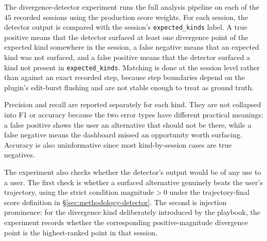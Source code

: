 The divergence-detector experiment runs the full analysis pipeline on each of the $45$ recorded sessions using the production score weights. For each session, the detector output is compared with the session's \texttt{expected\_kinds} label. A true positive means that the detector surfaced at least one divergence point of the expected kind somewhere in the session, a false negative means that an expected kind was not surfaced, and a false positive means that the detector surfaced a kind not present in \texttt{expected\_kinds}. Matching is done at the session level rather than against an exact recorded step, because step boundaries depend on the plugin's edit-burst flushing and are not stable enough to treat as ground truth.

Precision and recall are reported separately for each kind. They are not collapsed into F1 or accuracy because the two error types have different practical meanings: a false positive shows the user an alternative that should not be there, while a false negative means the dashboard missed an opportunity worth surfacing. Accuracy is also uninformative since most kind-by-session cases are true negatives.

The experiment also checks whether the detector's output would be of any use to a user. The first check is whether a surfaced alternative genuinely beats the user's trajectory, using the strict condition $\mathrm{magnitude} > 0$ under the trajectory-final score definition in \S\ref{sec:methodology-detector}. The second is injection prominence: for the divergence kind deliberately introduced by the playbook, the experiment records whether the corresponding positive-magnitude divergence point is the highest-ranked point in that session.
